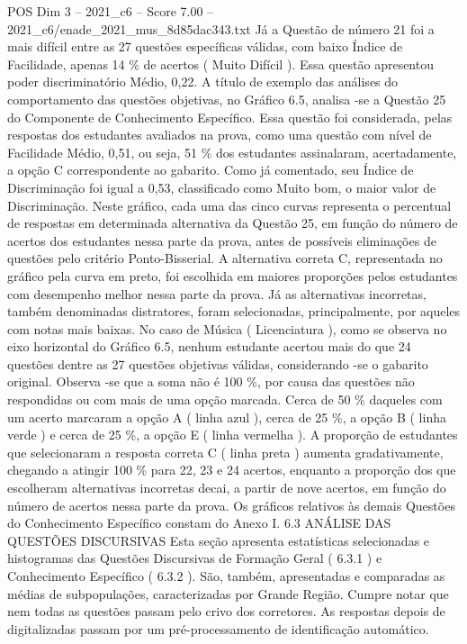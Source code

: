 \begin{textsample}{POS Dim 3 – 2021\_c6 – Score 7.00 – 2021\_c6/enade\_2021\_mus\_8d85dac343.txt}
Já a Questão de número 21 foi a mais difícil entre as 27 questões específicas válidas, com baixo Índice de Facilidade, apenas 14 \% de acertos ( Muito Difícil ).
Essa questão apresentou poder discriminatório Médio, 0,22.
A título de exemplo das análises do comportamento das questões objetivas, no Gráfico 6.5, analisa -se a Questão 25 do Componente de Conhecimento Específico.
Essa questão foi considerada, pelas respostas dos estudantes avaliados na prova, como uma questão com nível de Facilidade Médio, 0,51, ou seja, 51 \% dos estudantes assinalaram, acertadamente, a opção C correspondente ao gabarito.
Como já comentado, seu Índice de Discriminação foi igual a 0,53, classificado como Muito bom, o maior valor de Discriminação.
Neste gráfico, cada uma das cinco curvas representa o percentual de respostas em determinada alternativa da Questão 25, em função do número de acertos dos estudantes nessa parte da prova, antes de possíveis eliminações de questões pelo critério Ponto-Bisserial.
A alternativa correta C, representada no gráfico pela curva em preto, foi escolhida em maiores proporções pelos estudantes com desempenho melhor nessa parte da prova.
Já as alternativas incorretas, também denominadas distratores, foram selecionadas, principalmente, por aqueles com notas mais baixas.
No caso de Música ( Licenciatura ), como se observa no eixo horizontal do Gráfico 6.5, nenhum estudante acertou mais do que 24 questões dentre as 27 questões objetivas válidas, considerando -se o gabarito original.
Observa -se que a soma não é 100 \%, por causa das questões não respondidas ou com mais de uma opção marcada.
Cerca de 50 \% daqueles com um acerto marcaram a opção A ( linha azul ), cerca de 25 \%, a opção B ( linha verde ) e cerca de 25 \%, a opção E ( linha vermelha ).
A proporção de estudantes que selecionaram a resposta correta C ( linha preta ) aumenta gradativamente, chegando a atingir 100 \% para 22, 23 e 24 acertos, enquanto a proporção dos que escolheram alternativas incorretas decai, a partir de nove acertos, em função do número de acertos nessa parte da prova.
Os gráficos relativos às demais Questões do Conhecimento Específico constam do Anexo I. 6.3 ANÁLISE DAS QUESTÕES DISCURSIVAS Esta seção apresenta estatísticas selecionadas e histogramas das Questões Discursivas de Formação Geral ( 6.3.1 ) e Conhecimento Específico ( 6.3.2 ).
São, também, apresentadas e comparadas as médias de subpopulações, caracterizadas por Grande Região.
Cumpre notar que nem todas as questões passam pelo crivo dos corretores.
As respostas depois de digitalizadas passam por um pré-processamento de identificação automático.

\end{textsample}
